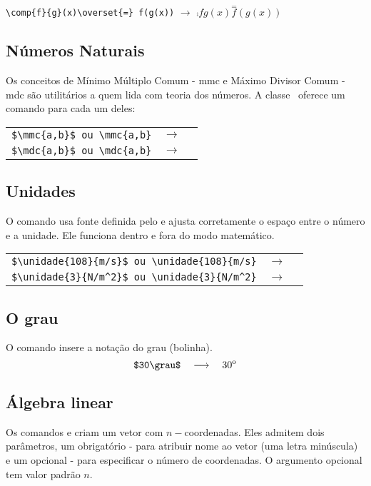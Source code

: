\begin{tcolorbox}	
	\verb|\comp{f}{g}(x)\overset{=} f(g(x))| $\longrightarrow$	
	$\comp{f}{g}(x) \overset{=} f(g(x))$
\end{tcolorbox}

\subsection{Números Naturais}

Os conceitos de Mínimo Múltiplo Comum - mmc e Máximo Divisor
Comum - mdc são utilitários a quem lida com teoria dos números.
A classe \estilo\ oferece um comando para cada um deles:
\begin{tcolorbox}
	\begin{tabular}{lcl}
		\verb|$\mmc{a,b}$ ou \mmc{a,b}|   & $\longrightarrow$ & \mmc{a,b} \\
		\verb|$\mdc{a,b}$ ou \mdc{a,b}|   & $\longrightarrow$ & \mdc{a,b}
	\end{tabular}
\end{tcolorbox}

\subsection{Unidades}

O comando  usa fonte  definida pelo  e ajusta corretamente o espaço entre o número e a unidade.
Ele funciona dentro e fora do modo matemático.
\begin{tcolorbox}
	\begin{tabular}{lcl}
		\verb|$\unidade{108}{m/s}$ ou \unidade{108}{m/s}| & $\longrightarrow$ & \unidade{108}{m/s} \\
		\verb|$\unidade{3}{N/m^2}$ ou \unidade{3}{N/m^2}| & $\longrightarrow$ & \unidade{3}{N/m^2}
	\end{tabular}
\end{tcolorbox}

\subsection{O grau}
O comando  insere a notação do grau (bolinha).
\[
    \verb|$30\grau$|\quad \longrightarrow\quad  30\grau
\]

\subsection{Álgebra linear}

Os comandos  e  criam um vetor com $n-$coordenadas.
Eles admitem dois parâmetros, um obrigatório - para atribuir
nome ao vetor (uma letra minúscula) e um opcional - para
especificar o número de coordenadas. O argumento opcional tem valor
padrão $n$.


